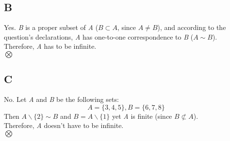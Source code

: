 \documentclass[12pt, oneside]{article}
\begin{document}
\subsection{B}
Yes. \emph{B} is a proper subset of \emph{A} ($B \subset A$, since $A \neq B$), and according to the question's declarations, \emph{A} has one-to-one correspondence to \emph{B} ($A \sim B$).\\
Therefore, \emph{A} has to be infinite.\\
$\bigotimes$

\subsection{C}
No. Let \emph{A} and \emph{B} be the following sets:
\begin{equation*}
A = \{3, 4, 5\}, B = \{6, 7, 8\}
\end{equation*}
Then $A\backslash\{2\} \sim B$ and $B = A\backslash\{1\}$ yet \emph{A} is finite (since $B \not\subset A$).\\
Therefore, \emph{A} doesn't have to be infinite.\\
$\bigotimes$
\end{document}
